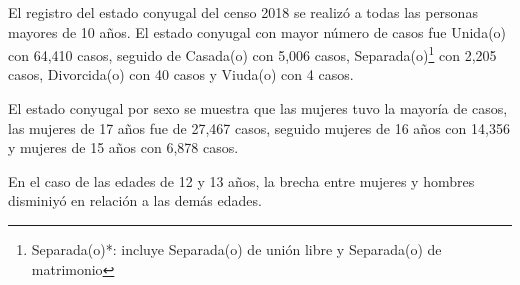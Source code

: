 El registro del estado conyugal del censo 2018 se realizó a todas las personas mayores de 10 años. El estado conyugal con mayor número de casos fue Unida(o) con 64,410 casos, seguido de Casada(o) con 5,006 casos, Separada(o)\footnote{Separada(o)*: incluye Separada(o) de unión libre y Separada(o) de matrimonio} con 2,205 casos, Divorcida(o) con 40 casos y Viuda(o) con 4 casos.

El estado conyugal por sexo se muestra que las mujeres tuvo la mayoría de casos, las mujeres de 17 años fue de 27,467 casos, seguido mujeres de 16 años con 14,356 y mujeres de 15 años con 6,878 casos. 

En el caso de las edades de 12 y 13 años, la brecha entre mujeres y hombres disminiyó en relación a las demás edades.  